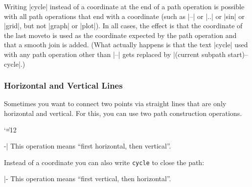 Writing |cycle| instead of a coordinate at the end of a path operation is
possible with all path operations that end with a coordinate (such as |--| or
|..| or |sin| or |grid|, but not |graph| or |plot|). In all cases, the effect
is that the coordinate of the last moveto is used as the coordinate expected by
the path operation and that a smooth join is added. (What actually happens is
that the text |cycle| used with any path operation other than |--| gets
replaced by |(current subpath start)--cycle|.)


\subsubsection{Horizontal and Vertical Lines}

Sometimes you want to connect two points via straight lines that are only
horizontal and vertical. For this, you can use two path construction
operations.

{\catcode`\|=12
\begin{pathoperation}[noindex]{-|}{}
    This operation means ``first horizontal, then vertical''.
\begin{codeexample}[]
\end{codeexample}
    Instead of a coordinate you can also write \verb!cycle! to close the path:
\begin{codeexample}[]
\end{codeexample}
\end{pathoperation}

\begin{pathoperation}[noindex]{|-}{}
    This operation means ``first vertical, then horizontal''.
\end{pathoperation}
}


